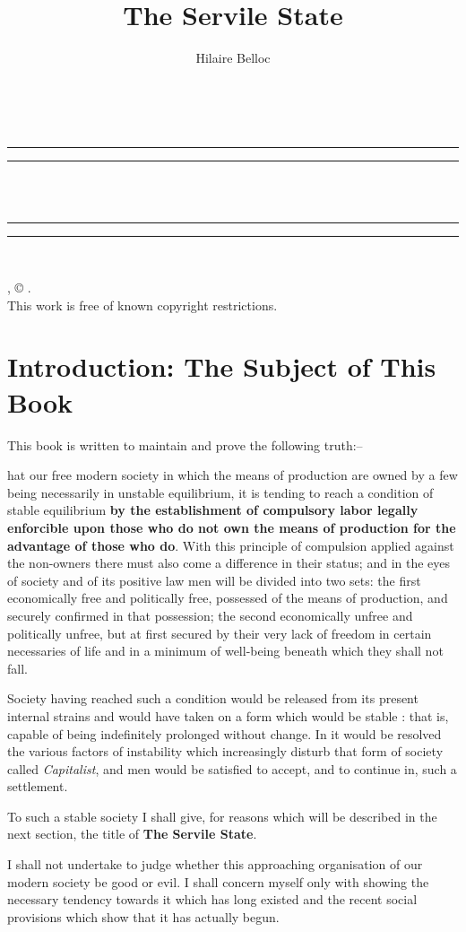 \documentclass{book}
\date{}
\title{The Servile State}
\author{Hilaire Belloc}
\makeatletter
\renewcommand{\maketitle}{
  \thispagestyle{empty}
  \vspace*{\stretch{1}}
  
  \begin{center}
    {\Huge \@title   \\[5mm]}
  \end{center}
  \vspace*{\stretch{2}}
  
  \newpage
  \thispagestyle{empty}
  \cleardoublepage

  \begin{center}  
    \thispagestyle{empty}
    \vspace*{\baselineskip}
    \rule{\textwidth}{1.6pt}\vspace*{-\baselineskip}\vspace*{2pt}
    \rule{\textwidth}{0.4pt}\\[\baselineskip]
    
    {\Huge\scshape \@title   \\[5mm]}
    {\Large }
    
    \rule{\textwidth}{0.4pt}\vspace*{-\baselineskip}\vspace{3.2pt}
    \rule{\textwidth}{1.6pt}\\[\baselineskip]

    \vspace*{4\baselineskip}

    {\Large \@author}
    \vfill
    
  \end{center}
  
  \pagebreak
  \newpage
  \thispagestyle{empty}
  \null\vfill
  \noindent
  \begin{center}
    {\emph{\@title}, © \@author.\\[5mm]}
    {This work is free of known copyright restrictions.\\[5mm]}
  \end{center}
  \pagebreak
  \newpage
}
\newcommand\mdstrong[1]{\textbf{#1}}
\makeatother
\begin{document}
\makeatletter
\renewcommand{\@chapapp}{Section}
\makeatother



\maketitle

\setcounter{tocdepth}{0}
\setcounter{secnumdepth}{0}
\tableofcontents
\chapter*{Introduction: The Subject of This Book}
\label{chapter-0}
This book is written to maintain and prove the following truth:–

hat our free modern society in which the means of production are owned by a few being necessarily in unstable equilibrium, it is tending to reach a condition of stable equilibrium \mdstrong{by the establishment of compulsory labor legally enforcible upon those who do not own the means of production for the advantage of those who do}. With this principle of compulsion applied against the non-owners there must also come a difference in their status; and in the eyes of society and of its positive law men will be divided into two sets: the first economically free and politically free, possessed of the means of production, and securely confirmed in that possession; the second economically unfree and politically unfree, but at first secured by their very lack of freedom in certain necessaries of life and in a minimum of well-being beneath which they shall not fall.

Society having reached such a condition would be released from its present internal strains and would have taken on a form which would be stable : that is, capable of being indefinitely prolonged without change. In it would be resolved the various factors of instability which increasingly disturb that form of society called \emph{Capitalist}, and men would be satisfied to accept, and to continue in, such a settlement.

To such a stable society I shall give, for reasons which will be described in the next section, the title of \mdstrong{The Servile State}.

I shall not undertake to judge whether this approaching organisation of our modern society be good or evil. I shall concern myself only with showing the necessary tendency towards it which has long existed and the recent social provisions which show that it has actually begun.
\end{document}
